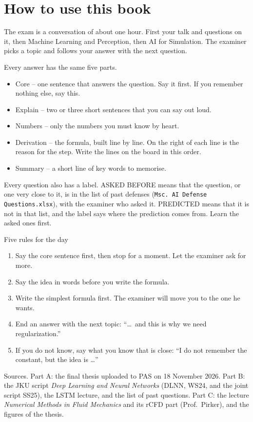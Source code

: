 \section*{How to use this book}

The exam is a conversation of about one hour. First your talk and questions on it, then Machine
Learning and Perception, then AI for Simulation. The examiner picks a topic and follows your answer
with the next question.

\textsf{Every answer has the same five parts.}
\begin{itemize}
\item \textsf{\color{qcol}Core} -- one sentence that answers the question. Say it first. If you
  remember nothing else, say this.
\item \textsf{\color{qcol}Explain} -- two or three short sentences that you can say out loud.
\item \textsf{\color{qcol}Numbers} -- only the numbers you must know by heart.
\item \textsf{\color{qcol}Derivation} -- the formula, built line by line. On the right of each line
  is the reason for the step. Write the lines on the board in this order.
\item \textsf{\color{remcol}Summary} -- a short line of key words to memorise.
\end{itemize}

\textsf{Every question also has a label.} \colorbox{askcol!15}{\textsf{\color{askcol}ASKED BEFORE}}
means that the question, or one very close to it, is in the list of past defenses
(\texttt{Msc.\ AI Defense Questions.xlsx}), with the examiner who asked it.
\colorbox{srccol!15}{\textsf{\color{srccol}PREDICTED}} means that it is not in that list, and the
label says where the prediction comes from. Learn the asked ones first.

\begin{tipbox}
\textsf{Five rules for the day}
\begin{enumerate}
\item Say the core sentence first, then stop for a moment. Let the examiner ask for more.
\item Say the idea in words before you write the formula.
\item Write the simplest formula first. The examiner will move you to the one he wants.
\item End an answer with the next topic: ``\ldots\ and this is why we need regularization.''
\item If you do not know, say what you know that is close: ``I do not remember the constant, but
  the idea is \ldots''
\end{enumerate}
\end{tipbox}

\textsf{Sources.} Part A: the final thesis uploaded to PAS on 18 November 2026. Part B: the JKU script
\emph{Deep Learning and Neural Networks} (DLNN, WS24, and the joint script SS25), the LSTM lecture,
and the list of past questions. Part C: the lecture \emph{Numerical Methods in Fluid Mechanics} and
its rCFD part (Prof.\ Pirker), and the figures of the thesis.
